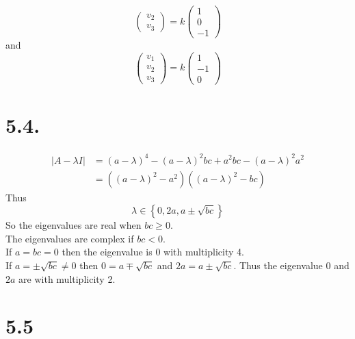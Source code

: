 \documentclass[11pt]{article}
\theoremstyle{mystyle}
\theoremstyle{definition}
\begin{document}
\begin{itemize}
\[\begin{pmatrix}
        v_2 \\
        v_3 
      \end{pmatrix}
      = k 
      \begin{pmatrix}
        1 \\
        0 \\
        -1
      \end{pmatrix}
    \]
    and 
    \[
      \begin{pmatrix}
        v_1 \\
        v_2 \\
        v_3 
      \end{pmatrix}
      = k 
      \begin{pmatrix}
        1 \\
        -1 \\
        0
      \end{pmatrix}
    \]
\end{itemize}
\clearpage 
\section*{5.4.}
\begin{align*}
  |A - \lambda I| &= (a-\lambda)^4  - (a-\lambda)^2 bc + a^2 bc - (a-\lambda)^2 a^2 \\
  &= ((a-\lambda)^2 - a^2) ( (a-\lambda)^2 - bc)
\end{align*}
Thus 
\[
  \lambda \in \left\{0, 2a, a \pm \sqrt{bc}\right\}
\]
So the eigenvalues are real when $bc \ge 0$. \\
The eigenvalues are complex if $bc < 0$. \\
If $a = bc = 0$ then the eigenvalue is $0$ with multiplicity 4. \\
If $a = \pm \sqrt{bc} \ne 0$ then $0 = a \mp \sqrt{bc}$ and $2a = a \pm \sqrt{bc}$. Thus the eigenvalue $0$ and $2a$ are with multiplicity 2. 
\clearpage 
\section*{5.5}
\end{document}
